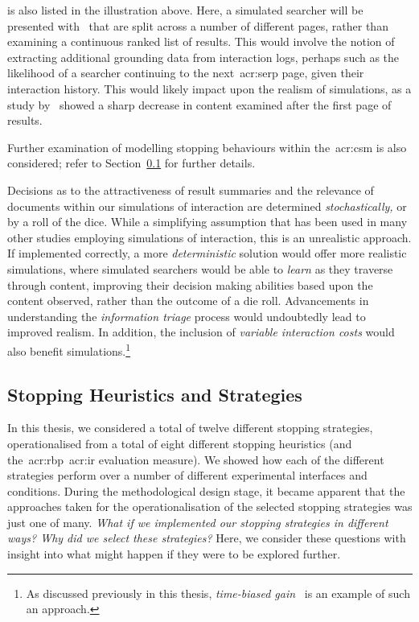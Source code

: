  is also listed in the illustration above. Here, a simulated searcher will be presented with~ that are split across a number of different pages, rather than examining a continuous ranked list of results. This would involve the notion of extracting additional grounding data from interaction logs, perhaps such as the likelihood of a searcher continuing to the next~\gls{acr:serp} page, given their interaction history. This would likely impact upon the realism of simulations, as a study by~\cite{jansen2005analysis} showed a sharp decrease in content examined after the first page of results.

Further examination of modelling stopping behaviours within the~\gls{acr:csm} is also considered; refer to Section~\ref{sec:conclusions:future:stopping} for further details.

 Decisions as to the attractiveness of result summaries and the relevance of documents within our simulations of interaction are determined \emph{stochastically,} or by a roll of the dice. While a simplifying assumption that has been used in many other studies employing simulations of interaction, this is an unrealistic approach. If implemented correctly, a more \emph{deterministic} solution would offer more realistic simulations, where simulated searchers would be able to \emph{learn} as they traverse through content, improving their decision making abilities based upon the content observed, rather than the outcome of a die roll. Advancements in understanding the \emph{information triage} process would undoubtedly lead to improved realism. In addition, the inclusion of \emph{variable interaction costs} would also benefit simulations.\footnote{As discussed previously in this thesis, \emph{time-biased gain}~\citep{smucker2012tbg} is an example of such an approach.}

\subsection{Stopping Heuristics and Strategies}\label{sec:conclusions:future:stopping}
In this thesis, we considered a total of twelve different stopping strategies, operationalised from a total of eight different stopping heuristics (and the~\gls{acr:rbp}~\gls{acr:ir} evaluation measure). We showed how each of the different strategies perform over a number of different experimental interfaces and conditions. During the methodological design stage, it became apparent that the approaches taken for the operationalisation of the selected stopping strategies was just one of many. \emph{What if we implemented our stopping strategies in different ways? Why did we select these strategies?} Here, we consider these questions with insight into what might happen if they were to be explored further.

